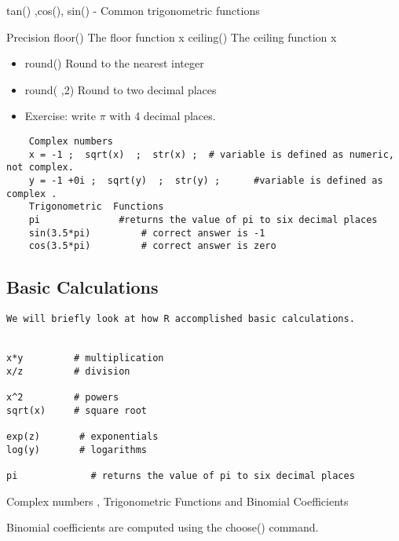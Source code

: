 \documentclass[a4paper,12pt]{article}
\begin{document}
tan() ,cos(), sin()   - Common trigonometric functions

 
 Precision
 floor() 	  The floor function 		x
 ceiling()    The ceiling function       x

\begin{itemize} 
\item round()      Round to the nearest integer
\item round( ,2)  Round to two decimal places
\end{itemize} 
 
\begin{itemize}
\item Exercise:  write $\pi$   with 4 decimal places.  
\end{itemize}

 
\begin{framed}
\begin{verbatim}
	Complex numbers
	x = -1 ;  sqrt(x)  ;  str(x) ; 	# variable is defined as numeric, not complex.
	y = -1 +0i ;  sqrt(y)  ;  str(y) ;    	#variable is defined as complex .
	Trigonometric  Functions
	pi				#returns the value of pi to six decimal places
	sin(3.5*pi)			# correct answer is -1
	cos(3.5*pi)			# correct answer is zero
\end{verbatim}
\end{framed}

\subsection{Basic Calculations}
\begin{verbatim}
We will briefly look at how R accomplished basic calculations.


x*y			# multiplication
x/z			# division

x^2			# powers
sqrt(x)		# square root

exp(z)		 # exponentials   
log(y)		 # logarithms

pi             # returns the value of pi to six decimal places

\end{verbatim}

Complex numbers , Trigonometric  Functions and Binomial Coefficients


Binomial coefficients are computed using the choose() command.
\end{document}
